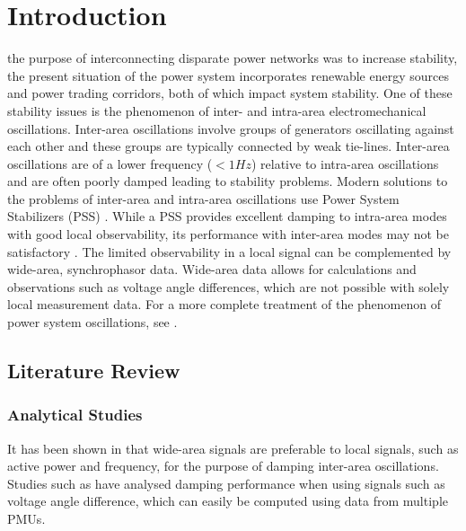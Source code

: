 \documentclass[journal]{IEEEtran}
\begin{document}
\section{Introduction}
 the purpose of interconnecting disparate power networks was to increase stability, the present situation of the power system incorporates renewable energy sources and power trading corridors, both of which impact system stability. One of these stability issues is the phenomenon of inter- and intra-area electromechanical oscillations\cite{KundurTwoArea}. Inter-area oscillations involve groups of generators oscillating against each other and these groups are typically connected by weak tie-lines\cite{KundurTwoArea}. Inter-area oscillations are of a lower frequency ($<1 Hz$) relative to intra-area oscillations and are often poorly damped leading to stability problems\cite{KundurTwoArea}. Modern solutions to the problems of inter-area and intra-area oscillations use Power System Stabilizers (PSS) \cite{WAPODNorway}. While a PSS provides excellent damping to intra-area modes with good local observability, its performance with inter-area modes may not be satisfactory \cite{localREMcomparison}. The limited observability in a local signal can be complemented by wide-area, synchrophasor data. Wide-area data allows for calculations and observations such as voltage angle differences, which are not possible with solely local measurement data\cite{Yuwa}. For a more complete treatment of the phenomenon of power system oscillations, see \cite{Rogers_book}.
\vspace{-1em}

\subsection{Literature Review}

\subsubsection*{Analytical Studies}

It has been shown in \cite{Yuwa} that wide-area signals are preferable to local signals, such as active power and frequency, \cite{localREMcomparison} for the purpose of damping inter-area oscillations. Studies such as \cite{Yuwa} have analysed damping performance when using signals such as voltage angle difference, which can easily be computed using data from multiple PMUs.
\end{document}
